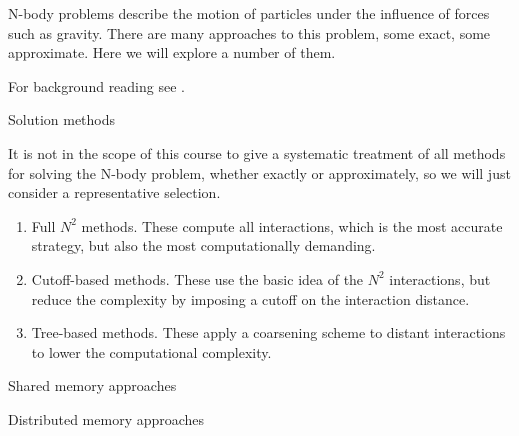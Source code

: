 
N-body problems describe the motion of particles under the influence
of forces such as gravity. There are many approaches to this problem,
some exact, some approximate. Here we will explore a number of them.

For background reading see .

 {Solution methods}

It is not in the scope of this course to give a systematic treatment
of all methods for solving the N-body problem, whether exactly or
approximately, so we will just consider a representative selection.

\begin{enumerate}
\item Full $N^2$ methods. These compute all interactions, which is the
  most accurate strategy, but also the most computationally demanding.
\item Cutoff-based methods. These use the basic idea of the
  $N^2$ interactions, but reduce the complexity by imposing a cutoff
  on the interaction distance.
\item Tree-based methods. These apply a coarsening scheme to distant
  interactions to lower the computational complexity.
\end{enumerate}

 {Shared memory approaches}

 {Distributed memory approaches}
